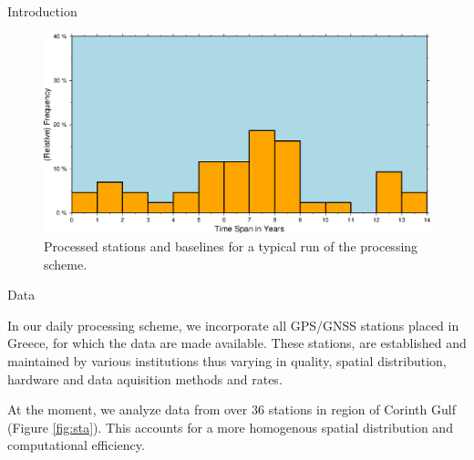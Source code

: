 \documentclass[final,a0,portrait]{beamer}
\newlength{\onecolwid}
\begin{document}
\begin{frame}[t]
\begin{columns}[t]
\begin{column}{\onecolwid}
\begin{block}{Introduction}
{}

\begin{figure}
    \centering
    \includegraphics[width=0.7\onecolwid]{sample}
    \caption{Processed stations and baselines for a typical run of the processing scheme.}
    \label{fig:proc-net}
\end{figure}

\end{block}
\begin{block}{Data}
{\small
In our daily processing scheme, we incorporate all GPS/GNSS stations placed in Greece, for which the data are made available. 
These stations, are established and maintained by various institutions thus varying in quality, spatial distribution, hardware and 
data aquisition methods and rates.

At the moment, we analyze data from over 36 stations in region of Corinth Gulf (Figure \ref{fig:sta}). 
This accounts for a more homogenous spatial distribution and computational efficiency.


}
\end{block}
\end{column}
\end{columns}
\end{frame}
\end{document}
